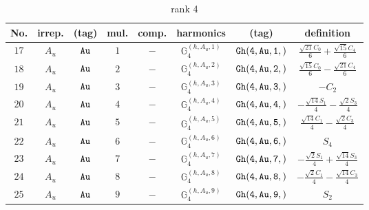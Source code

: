 \documentclass[fleqn,8pt]{jsarticle}
\begin{document}
\begin{table}[ht!]
\begin{center}
\caption{rank 4}
\renewcommand{\arraystretch}{1.3}
\begin{tabular}{cccccccc} \hline \hline
No. & irrep. & (tag) & mul. & comp. & harmonics & (tag) & definition \\ \hline
$ 17 $ & $ A_{u} $ & $ {\tt Au} $ & $ 1 $ & $ - $ & $ \mathbb{G}_{4}^{(h,A_{u},1)} $ & $ {\tt Gh(4,Au,1,)} $ & $ \frac{\sqrt{21} C_{0}}{6} + \frac{\sqrt{15} C_{4}}{6} $ \\
$ 18 $ & $ A_{u} $ & $ {\tt Au} $ & $ 2 $ & $ - $ & $ \mathbb{G}_{4}^{(h,A_{u},2)} $ & $ {\tt Gh(4,Au,2,)} $ & $ \frac{\sqrt{15} C_{0}}{6} - \frac{\sqrt{21} C_{4}}{6} $ \\
$ 19 $ & $ A_{u} $ & $ {\tt Au} $ & $ 3 $ & $ - $ & $ \mathbb{G}_{4}^{(h,A_{u},3)} $ & $ {\tt Gh(4,Au,3,)} $ & $ - C_{2} $ \\
$ 20 $ & $ A_{u} $ & $ {\tt Au} $ & $ 4 $ & $ - $ & $ \mathbb{G}_{4}^{(h,A_{u},4)} $ & $ {\tt Gh(4,Au,4,)} $ & $ - \frac{\sqrt{14} S_{1}}{4} - \frac{\sqrt{2} S_{3}}{4} $ \\
$ 21 $ & $ A_{u} $ & $ {\tt Au} $ & $ 5 $ & $ - $ & $ \mathbb{G}_{4}^{(h,A_{u},5)} $ & $ {\tt Gh(4,Au,5,)} $ & $ \frac{\sqrt{14} C_{1}}{4} - \frac{\sqrt{2} C_{3}}{4} $ \\
$ 22 $ & $ A_{u} $ & $ {\tt Au} $ & $ 6 $ & $ - $ & $ \mathbb{G}_{4}^{(h,A_{u},6)} $ & $ {\tt Gh(4,Au,6,)} $ & $ S_{4} $ \\
$ 23 $ & $ A_{u} $ & $ {\tt Au} $ & $ 7 $ & $ - $ & $ \mathbb{G}_{4}^{(h,A_{u},7)} $ & $ {\tt Gh(4,Au,7,)} $ & $ - \frac{\sqrt{2} S_{1}}{4} + \frac{\sqrt{14} S_{3}}{4} $ \\
$ 24 $ & $ A_{u} $ & $ {\tt Au} $ & $ 8 $ & $ - $ & $ \mathbb{G}_{4}^{(h,A_{u},8)} $ & $ {\tt Gh(4,Au,8,)} $ & $ - \frac{\sqrt{2} C_{1}}{4} - \frac{\sqrt{14} C_{3}}{4} $ \\
$ 25 $ & $ A_{u} $ & $ {\tt Au} $ & $ 9 $ & $ - $ & $ \mathbb{G}_{4}^{(h,A_{u},9)} $ & $ {\tt Gh(4,Au,9,)} $ & $ S_{2} $ \\
 \hline \hline
\end{tabular}
\end{center}
\end{table}
\end{document}
